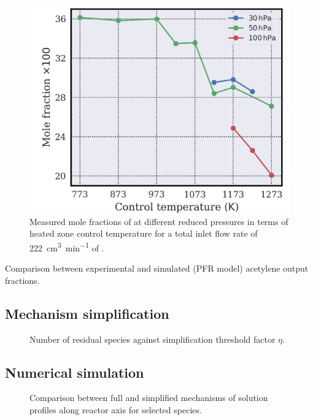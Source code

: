 \documentclass[final,3p,times,twocolumn,sort&compress]{elsarticle}
\begin{document}
\begin{figure}
	\centering
	\includegraphics[width=\linewidth]
	{figures/fractions_low_pressure}
	\caption{\label{fig:fractions-low-pressure}Measured mole fractions of  at different reduced pressures in terms of heated zone control temperature for a total inlet flow rate of \SI{222}{\cubic\centi\metre\per\minute} of .}
\end{figure}

\begin{table}
	\caption{\label{tab-comparison-sim-exp}Comparison between experimental and simulated (PFR model) acetylene output fractions.}
\end{table}

\subsection{Mechanism simplification}

\begin{figure}
	\caption{\label{fig:simplification-curves}Number of residual species against simplification threshold factor $\eta$.}
\end{figure}

\subsection{Numerical simulation}

\begin{figure}
	\caption{\label{fig:solution comparison}Comparison between full and simplified mechanisms of solution profiles along reactor axis for selected species.}
\end{figure}
\end{document}
